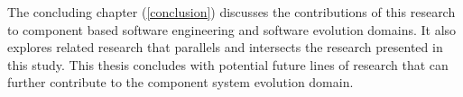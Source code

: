 The concluding chapter (\ref{conclusion}) discusses the contributions of this research to component based software engineering and software evolution domains.
It also explores related research that parallels and intersects the research presented in this study.
This thesis concludes with potential future lines of research that can further contribute to the component system evolution domain. 